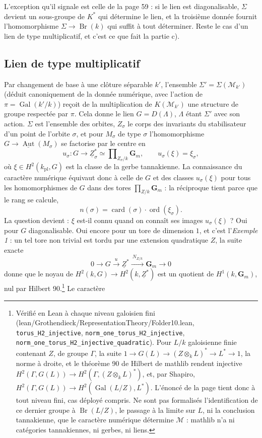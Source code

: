 \documentclass[11pt,a4paper]{article}
\begin{document}
L'exception qu'il signale est celle de la page 59 : si le lien est
diagonalisable, $\Sigma$ devient un sous-groupe de $K^{*}$ qui détermine le
lien, et la troisième donnée fournit l'homomorphisme $\Sigma \to
\operatorname{Br}(k)$ qui suffit à tout déterminer. Reste le cas d'un lien de
type multiplicatif, et c'est ce que fait la partie c).

\subsection*{Lien de type multiplicatif}

Par changement de base à une clôture séparable $k'$, l'ensemble $\Sigma' =
\Sigma(\mathcal{M}_{k'})$ (déduit canoniquement de la donnée numérique, avec
l'action de $\pi = \operatorname{Gal}(k'/k)$) reçoit de la multiplication de
$K(\mathcal{M}_{k'})$ une structure de groupe respectée par $\pi$. Cela donne
le lien $G = D(\Lambda)$, $\Lambda$ étant $\Sigma'$ avec son action. $\Sigma$
est l'ensemble des orbites, $Z_{\sigma}$ le corps des invariants du
stabilisateur d'un point de l'orbite $\sigma$, et pour $M_{\sigma}$ de type
$\sigma$ l'homomorphisme $G \to
\underline{\operatorname{Aut}}(M_{\sigma})$ se factorise par le centre en
\[
u_{\sigma} \colon G \longrightarrow \underline{Z}^{*}_{\sigma}
\simeq \prod\nolimits_{Z_{\sigma}/k} \mathbf{G}_{m} ,
\qquad u_{\sigma}(\xi) = \xi_{\sigma} ,
\]
où $\xi \in H^{2}(k_{\mathrm{pl}}, G)$ est la classe de la gerbe tannakienne.
La connaissance du caractère numérique équivaut donc à celle de $G$ et des
classes $u_{\sigma}(\xi)$ pour tous les homomorphismes de $G$ dans des tores
$\prod_{Z/k}\mathbf{G}_{m}$ : la réciproque tient parce que le rang se calcule,
\[
n(\sigma) = \operatorname{card}(\sigma) \cdot \operatorname{ord}(\xi_{\sigma}) .
\]
La question devient : $\xi$ est-il connu quand on connaît ses images
$u_{\sigma}(\xi)$ ? Oui pour $G$ diagonalisable. Oui encore pour un tore de
dimension $1$, et c'est l'\emph{Exemple 1} : un tel tore non trivial est tordu
par une extension quadratique $Z$, la suite exacte
\[
0 \longrightarrow G \xrightarrow{\ u\ } \underline{Z}^{*}
\xrightarrow{\ N_{Z/k}\ } \mathbf{G}_{m} \longrightarrow 0
\]
donne que le noyau de $H^{2}(k,G) \to H^{2}(k, \underline{Z}^{*})$ est un
quotient de $H^{1}(k, \mathbf{G}_{m})$, nul par Hilbert 90.\footnote{Vérifié
en Lean à chaque niveau galoisien fini (lean/Grothendieck/RepresentationTheory/Folder10.lean,
\texttt{torus\_H2\_injective}, \texttt{norm\_one\_torus\_H2\_injective},
\texttt{norm\_one\_torus\_H2\_injective\_quadratic}). Pour $L/k$ galoisienne
finie contenant $Z$, de groupe $\Gamma$, la suite $1 \to G(L) \to (Z
\otimes_{k} L)^{*} \to L^{*} \to 1$, la norme à droite, et le théorème 90 de
Hilbert de mathlib rendent injective $H^{2}(\Gamma, G(L)) \to H^{2}(\Gamma, (Z
\otimes_{k} L)^{*})$, et, par Shapiro, $H^{2}(\Gamma, G(L)) \to
H^{2}(\operatorname{Gal}(L/Z), L^{*})$. L'énoncé de la page tient donc à tout
niveau fini, cas déployé compris. Ne sont pas formalisés l'identification de
ce dernier groupe à $\operatorname{Br}(L/Z)$, le passage à la limite sur $L$,
ni la conclusion tannakienne, que le caractère numérique détermine
$\mathcal{M}$ : mathlib n'a ni catégories tannakiennes, ni gerbes, ni liens.} Le caractère
\end{document}
